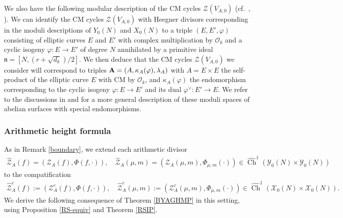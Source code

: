 \documentclass{amsart}
\theoremstyle{definition}
\theoremstyle{definition}
\theoremstyle{definition}
\begin{document}
We also have the following modular description of the CM cycles $\mathcal{Z}(V_{A,0})$ (cf.~\cite[Proposition 7.2]{BY}, \cite{GZ}).
We can identify the CM cycles $\mathcal{Z}(V_{A,0})$ 
with Heegner divisors corresponding in the moduli descriptions of $Y_0(N)$ and $X_0(N)$ to a triple $(E, E', \varphi)$ consisting 
of elliptic curves $E$ and $E'$ with complex multiplication by $\mathcal{O}_k$ and a cyclic isogeny $\varphi: E \rightarrow E'$
of degree $N$ annihilated by a primitive ideal $\mathfrak{n} = [N, (r+\sqrt{d_k})/2]$. We then deduce that the CM
cycles $\mathcal{Z}(V_{A,0})$ we consider will correspond to triples ${\bf{A}} = (A, \kappa_A(\varphi), \lambda_A)$ with 
$A = E \times E$ the self-product of the elliptic curve $E$ with CM by $\mathcal{O}_k$, and $\kappa_A(\varphi)$ the endomorphism
corresponding to the cyclic isogeny $\varphi: E \rightarrow E'$ and its dual $\varphi^{\vee}: E' \rightarrow E$.
We refer to the discussions in \cite{vdG} and \cite{HY} for a more general description of these moduli spaces 
of abelian surfaces with special endomorphisms.

\subsubsection{Arithmetic height formula}

As in Remark \ref{boundary}, we extend each arithmetic divisor 
\begin{align*} \widehat{\mathcal{Z}}_A(f) = (\mathcal{Z}_A(f), \Phi(f, \cdot)), \quad
\widehat{\mathcal{Z}}_A(\mu, m) = (\mathcal{Z}_A(\mu, m), \Phi_{\mu, m}(\cdot))
\in \widehat{\operatorname{Ch}}^1 \left( \mathcal{Y}_0(N) \times \mathcal{Y}_0(N) \right) \end{align*}
to the compatification
\begin{align}\label{Hilbertboundary} \widehat{\mathcal{Z}}_A^c(f) := (\mathcal{Z}_A^c(f), \Phi(f, \cdot)), \quad
\widehat{\mathcal{Z}}_A^c(\mu, m) := (\mathcal{Z}_A^c(\mu, m), \Phi_{\mu, m}(\cdot))
\in \widehat{\operatorname{Ch}}^1 \left( \mathcal{X}_0(N) \times \mathcal{X}_0(N) \right).\end{align}
We derive the following consequence of Theorem \ref{BYAGHMP} in this setting, 
using Proposition \ref{RS-equiv} and Theorem \ref{RSIP}.
\end{document}
